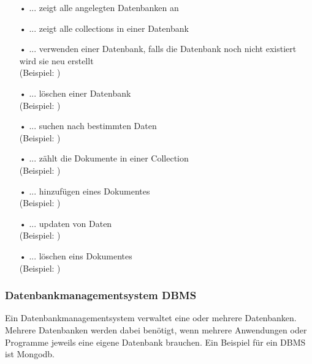 \begin{itemize} 
\item[•] \textbf{} ... zeigt alle angelegten Datenbanken an
\item[•] \textbf{} ... zeigt alle collections in einer Datenbank
\item[•] \textbf{} ... verwenden einer Datenbank, falls die Datenbank noch nicht existiert wird sie neu erstellt 
\\     (Beispiel:  )
\item[•] \textbf{} ... löschen einer Datenbank
\\     (Beispiel:  )
\item[•] \textbf{} ... suchen nach bestimmten Daten 
\\     (Beispiel:  )
\item[•] \textbf{} ... zählt die Dokumente in einer Collection
\\     (Beispiel:  )
\item[•] \textbf{} ... hinzufügen eines Dokumentes
\\     (Beispiel:  )
\item[•] \textbf{} ... updaten von Daten
\\     (Beispiel:  )
\item[•] \textbf{} ... löschen eins Dokumentes
\\     (Beispiel:  )
\end{itemize}

\subsubsection{Datenbankmanagementsystem DBMS}
Ein Datenbankmanagementsystem verwaltet eine oder mehrere Datenbanken. Mehrere Datenbanken werden dabei benötigt, wenn mehrere Anwendungen oder Programme jeweils eine eigene Datenbank brauchen. Ein Beispiel für ein DBMS ist Mongodb.

